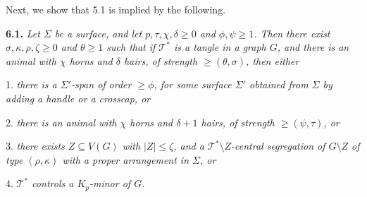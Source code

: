 
Next, we show that 5.1 is implied by the following.

\textbf{6.1.} \textit{Let $\Sigma$ be a surface, and let $p, \tau, \chi, \delta \ge 0$ and $\phi, \psi \ge 1$. Then there exist $\sigma, \kappa, \rho, \zeta \ge 0$ and $\theta \ge 1$ such that if $\mathscr{T}^*$ is a tangle in a graph $G$, and there is an animal with $\chi$ horns and $\delta$ hairs, of strength $\ge (\theta, \sigma)$, then either}

\hspace*{12pt}1. \textit{there is a $\Sigma'$-span of order $\ge \phi$, for some surface $\Sigma'$ obtained from $\Sigma$ by adding a handle or a crosscap, or}

\hspace*{12pt}2. \textit{there is an animal with $\chi$ horns and $\delta + 1$ hairs, of strength $\ge (\psi, \tau)$, or}

\hspace*{12pt}3. \textit{there exists $Z \subseteq V(G)$ with $|Z| \le \zeta$, and a $\mathscr{T}^* \setminus Z$-central segregation of $G \setminus Z$ of type $(\rho, \kappa)$ with a proper arrangement in $\Sigma$, or}

\hspace*{12pt}4. \textit{$\mathscr{T}^*$ controls a $K_p$-minor of $G$.}
